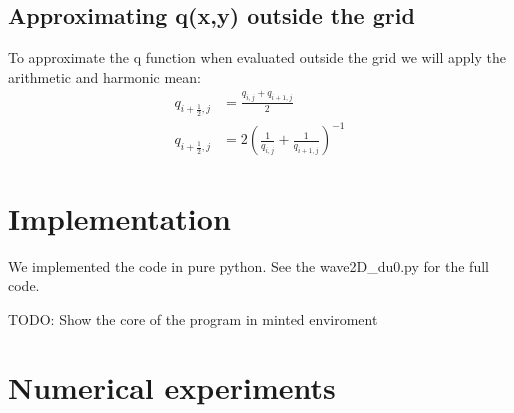 \documentclass[twoside]{article}
\begin{document}
\subsection{Approximating q(x,y) outside the grid}
To approximate the q function when evaluated outside the grid we will apply the arithmetic and harmonic mean:
\begin{align}
q_{i+\frac{1}{2},j} &= \frac{q_{i,j} + q_{i+1,j}}{2} \label{armean} \\
q_{i+\frac{1}{2},j} &= 2 (\frac{1}{q_{i,j}} + \frac{1}{q_{i+1,j}})^{-1} \label{harmean}
\end{align}

\section{Implementation}
We implemented the code in pure python. See the wave2D\_du0.py for the full code.

TODO: Show the core of the program in minted enviroment

\section{Numerical experiments}
\end{document}
